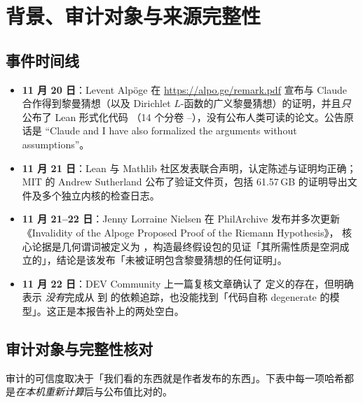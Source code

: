 \section{背景、审计对象与来源完整性}

\subsection{事件时间线}

\begin{itemize}
\item \textbf{11 月 20 日}：Levent Alpöge 在 \url{https://alpo.ge/remark.pdf} 宣布与 Claude 合作得到黎曼猜想（以及 Dirichlet $L$-函数的广义黎曼猜想）的证明，并且\emph{只}公布了 Lean 形式化代码
（14 个分卷 –），没有公布人类可读的论文。公告原话是 ``Claude and I have also formalized the arguments without assumptions''。
\item \textbf{11 月 21 日}：Lean 与 Mathlib 社区发表联合声明，认定陈述与证明均正确；MIT 的 Andrew Sutherland 公布了验证文件页，包括 61.57\,GB 的证明导出文件及多个独立内核的检查日志。
\item \textbf{11 月 21–22 日}：Jenny Lorraine Nielsen 在 PhilArchive 发布并多次更新《Invalidity of the Alpoge Proposed Proof of the Riemann Hypothesis》，
核心论据是几何谓词被定义为 ，构造最终假设包的见证「其所需性质是空洞成立的」，结论是该发布「未被证明包含黎曼猜想的任何证明」。
\item \textbf{11 月 22 日}：DEV Community 上一篇复核文章确认了  定义的存在，但明确表示
\emph{没有}完成从  到  的依赖追踪，也没能找到「代码自称 degenerate 的模型」。这正是本报告补上的两处空白。
\end{itemize}

\subsection{审计对象与完整性核对}
\label{sec:provenance}

审计的可信度取决于「我们看的东西就是作者发布的东西」。下表中每一项哈希都是\emph{在本机重新计算}后与公布值比对的。

